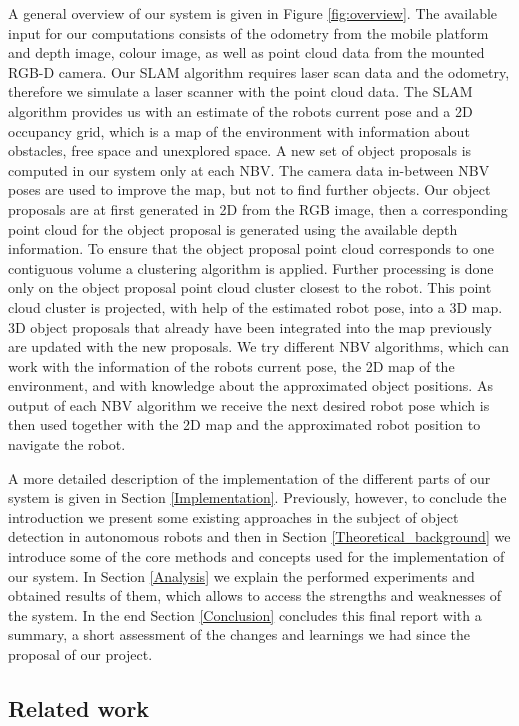 \documentclass[a4paper,11pt,english]{article}
\begin{document}
A general overview of our system is given in Figure \ref{fig:overview}.
The available input for our computations consists of the odometry from the mobile platform and depth image, colour image, as well as point cloud data from the mounted RGB-D camera. Our SLAM algorithm requires laser scan data and the odometry, therefore we simulate a laser scanner with the point cloud data.
The SLAM algorithm provides us with an estimate of the robots current pose and a 2D occupancy grid, which is a map of the environment with information about obstacles, free space and unexplored space. 
A new set of object proposals is computed in our system only at each NBV. The camera data in-between NBV poses are used to improve the map, but not to find further objects.
Our object proposals are at first generated in 2D from the RGB image, then a corresponding point cloud for the object proposal is generated using the available depth information. To ensure that the object proposal point cloud corresponds to one contiguous volume a clustering algorithm is applied. Further processing is done only on the object proposal point cloud cluster closest to the robot. 
This point cloud cluster is projected, with help of the estimated robot pose, into a 3D map.
3D object proposals that already have been integrated into the map previously are updated with the new proposals.
We try different NBV algorithms, which can work with the information of the robots current pose, the 2D map of the environment, and with knowledge about the approximated object positions.
As output of each NBV algorithm we receive the next desired robot pose which is then used together with the 2D map and the approximated robot position to navigate the robot.

\medskip

A more detailed description of the implementation of the different parts of our system is given in Section \ref{Implementation}.
Previously, however, to conclude the introduction we present some existing approaches in the subject of object detection in autonomous robots and then in Section \ref{Theoretical_background} we introduce some of the core methods and concepts used for the implementation of our system.
In Section \ref{Analysis} we explain the performed experiments and obtained results of them, which allows to access the strengths and weaknesses of the system. In the end Section \ref{Conclusion} concludes this final report with a summary, a short assessment of the changes and learnings we had since the proposal of our project.

\subsection{Related work}
\end{document}

